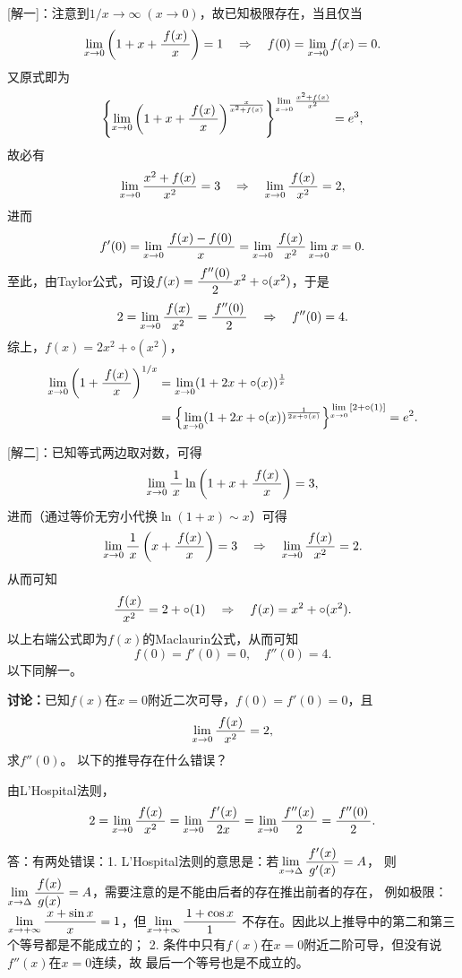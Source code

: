[解一]：注意到$1/x\to\infty\;(x\to0)$，故已知极限存在，当且仅当
$$\limx0\left(1+x+\df{f(x)}x\right)=1
\quad\Rightarrow\quad f(0)=\limx0f(x)=0.$$
又原式即为
$$\left\{\limx0\left(1+x+\df{f(x)}{x}\right)
^{\frac{x}{x^2+f(x)}}\right\}^{\limx0\frac{x^2+f(x)}{x^2}}=e^3,$$
故必有
$$\limx0\frac{x^2+f(x)}{x^2}=3\quad\Rightarrow\quad
\limx0\df{f(x)}{x^2}=2,$$
进而
$$f'(0)=\limx0\df{f(x)-f(0)}x=\limx0\df{f(x)}{x^2}\limx0x=0.$$
至此，由Taylor公式，可设$f(x)=\df{f''(0)}2x^2+\circ(x^2)$，于是
$$2=\limx0\df{f(x)}{x^2}=\df{f''(0)}2\quad\Rightarrow\quad
f''(0)=4.$$
综上，$f(x)=2x^2+\circ(x^2)$，
\begin{align}
	\limx{0}\left(1+\df{f(x)}{x}\right)^{1/x}
	&=\limx0(1+2x+\circ(x))^{\frac1x}\notag\\
	&=\left\{\limx0(1+2x+\circ(x))^{\frac1{2x+\circ(x)}}\right\}
	^{\limx0{[2+\circ(1)]}}=e^2.\notag	
\end{align}
\fin

[解二]：已知等式两边取对数，可得
$$\limx0\df1x\ln\left(1+x+\df{f(x)}x\right)=3,$$
进而（通过等价无穷小代换$\ln(1+x)\sim x$）可得
$$\limx0\df1x\left(x+\df{f(x)}x\right)=3
\quad\Rightarrow\quad
\limx0\df{f(x)}{x^2}=2.$$
从而可知
$$\df{f(x)}{x^2}=2+\circ(1)
\quad\Rightarrow\quad
f(x)=x^2+\circ(x^2).$$
以上右端公式即为$f(x)$的Maclaurin公式，从而可知
$$f(0)=f'(0)=0,\quad f''(0)=4.$$
以下同解一。\fin

{\bf 讨论：}已知$f(x)$在$x=0$附近二次可导，$f(0)=f'(0)=0$，且
$$\limx0\df{f(x)}{x^2}=2,$$
求$f''(0)$。
以下的推导存在什么错误？

{\color{red}由L'Hospital法则，
$$2=\limx0\df{f(x)}{x^2}=\limx0\df{f'(x)}{2x}
=\limx0\df{f''(x)}{2}=\df{f''(0)}2.$$}

答：有两处错误：1. L'Hospital法则的意思是：若$\limx{\Delta}\df{f'(x)}{g'(x)}=A$，
则$\limx{\Delta}\df{f(x)}{g(x)}=A$，需要注意的是不能由后者的存在推出前者的存在，
例如极限：$\limx{+\infty}\df{x+\sin x}x=1$，但$\limx{+\infty}\df{1+\cos x}1$
不存在。因此以上推导中的第二和第三个等号都是不能成立的；
2. 条件中只有$f(x)$在$x=0$附近二阶可导，但没有说$f''(x)$在$x=0$连续，故
最后一个等号也是不成立的。


%

% 


